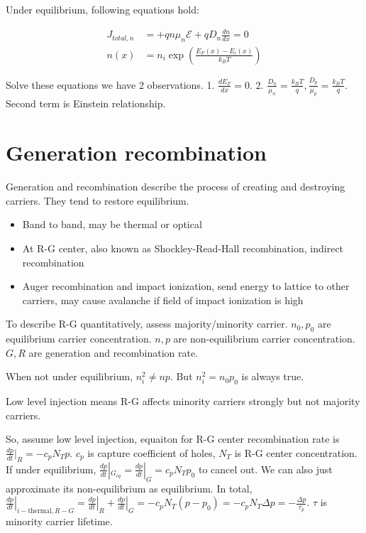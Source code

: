 \documentclass[a4paper,10pt]{article}
\begin{document}
\begin{multicols}{3}
Under equilibrium, following equations hold:

\begin{align*}
    J_{total,n} &= +qn\mu_{n}\mathcal{E} + qD_{n}\frac{dn}{dx} = 0\\
    n(x) &= n_{i}\exp{\left(\frac{E_{F}(x)-E_i(x)}{k_{B}T}\right)}
\end{align*}

Solve these equations we have 2 observations. 1. $\frac{dE_F}{dx}=0$. 2. $\frac{D_{n}}{\mu_{n}} = \frac{k_{B}T}{q}, \frac{D_{p}}{\mu_{p}} = \frac{k_{B}T}{q}$. Second term is Einstein relationship.

\section*{Generation recombination}

Generation and recombination describe the process of creating and destroying carriers. They tend to restore equilibrium.

\begin{itemize}[noitemsep, topsep=0pt, left=0pt]
    \item Band to band, may be thermal or optical
    \item At R-G center, also known as Shockley-Read-Hall recombination, indirect recombination
    \item Auger recombination and impact ionization, send energy to lattice to other carriers, may cause avalanche if field of impact ionization is high
\end{itemize}

To describe R-G quantitatively, assess majority/minority carrier. $n_0, p_0$ are equilibrium carrier concentration. $n, p$ are non-equilibrium carrier concentration. $G, R$ are generation and recombination rate.

When not under equilibrium, $n_i^2 \ne np$. But $n_i^2 = n_0 p_0$ is always true.

Low level injection means R-G affects minority carriers strongly but not majority carriers.

So, assume low level injection, equaiton for R-G center recombination rate is $\frac{dp}{dt}|_{R} = -c_{p}N_{T}p$. $c_p$ is capture coefficient of holes, $N_T$ is R-G center concentration. If under equilibrium, $\frac{dp}{dt}|_{G_{eq}} = \frac{dp}{dt}|_{G} = c_{p}N_{T}p_{0}$ to cancel out. We can also just approximate its non-equilibrium as equilibrium. In total, $\left.\frac{dp}{dt}\right|_{i-\text{thermal},R-G} = \left.\frac{dp}{dt}\right|_{R} + \left.\frac{dp}{dt}\right|_{G} = -c_{p}N_{T}(p - p_{0}) = -c_{p}N_{T}\Delta p = -\frac{\Delta p}{\tau_p}$. $\tau$ is minority carrier lifetime.


\end{multicols}
\end{document}
